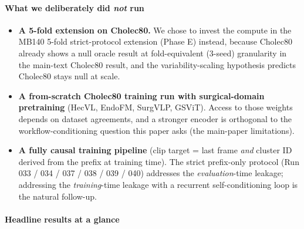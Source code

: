 \paragraph{\texorpdfstring{What we deliberately did \emph{not}
run}{What we deliberately did not run}}\label{what-we-deliberately-did-not-run}

\begin{itemize}
\tightlist
\item
  \textbf{A 5-fold extension on Cholec80.} We chose to invest the
  compute in the MB140 5-fold strict-protocol extension (Phase E)
  instead, because Cholec80 already shows a null oracle result at
  fold-equivalent (3-seed) granularity in the main-text Cholec80 result, and the
  variability-scaling hypothesis predicts Cholec80 stays null at scale.
\item
  \textbf{A from-scratch Cholec80 training run with surgical-domain
  pretraining} (HecVL, EndoFM, SurgVLP, GSViT). Access to those weights
  depends on dataset agreements, and a stronger encoder is orthogonal to
  the workflow-conditioning question this paper asks (the main-paper limitations).
\item
  \textbf{A fully causal training pipeline} (clip target = last frame
  \emph{and} cluster ID derived from the prefix at training time). The
  strict prefix-only protocol (Run 033 / 034 / 037 / 038 / 039 / 040)
  addresses the \emph{evaluation}-time leakage; addressing the
  \emph{training}-time leakage with a recurrent self-conditioning loop
  is the natural follow-up.
\end{itemize}

\paragraph{Headline results at a
glance}\label{headline-results-at-a-glance}

